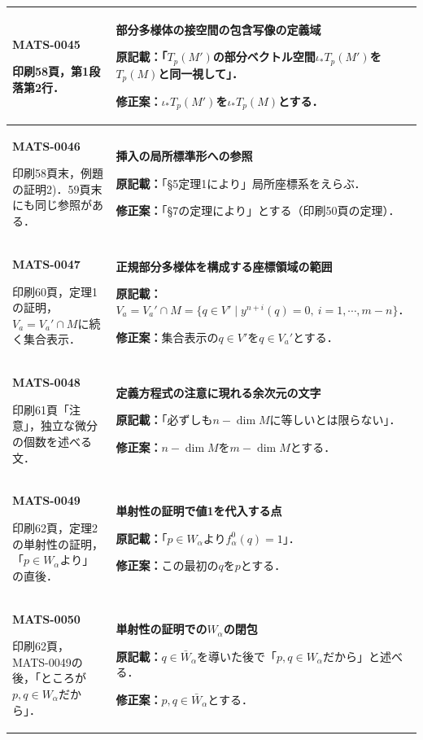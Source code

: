\documentclass[a4paper,10pt]{ltjsarticle}
\begin{document}
\begin{longtable}{@{}>{\raggedright\arraybackslash}p{.19\linewidth}>{\raggedright\arraybackslash}p{.77\linewidth}@{}}
\hline
\hypertarget{MATS-0045}{}\textbf{MATS-0045}\par 印刷58頁，第1段落第2行． & \textbf{部分多様体の接空間の包含写像の定義域}\par\textbf{原記載：}「$T_p(M')$の部分ベクトル空間$\iota_*T_p(M')$を$T_p(M)$と同一視して」．\par\textbf{修正案：}$\iota_*T_p(M')$を$\iota_*T_p(M)$とする． \\[3pt]
\hline
\hypertarget{MATS-0046}{}\textbf{MATS-0046}\par 印刷58頁末，例題の証明2)．59頁末にも同じ参照がある． & \textbf{挿入の局所標準形への参照}\par\textbf{原記載：}「\S5定理1により」局所座標系をえらぶ．\par\textbf{修正案：}「\S7の定理により」とする（印刷50頁の定理）． \\[3pt]
\hline
\hypertarget{MATS-0047}{}\textbf{MATS-0047}\par 印刷60頁，定理1の証明，$V_a=V_a'\cap M$に続く集合表示． & \textbf{正規部分多様体を構成する座標領域の範囲}\par\textbf{原記載：}$V_a=V_a'\cap M=\{q\in V'\mid y^{n+i}(q)=0,\ i=1,\cdots,m-n\}$．\par\textbf{修正案：}集合表示の$q\in V'$を$q\in V_a'$とする． \\[3pt]
\hline
\hypertarget{MATS-0048}{}\textbf{MATS-0048}\par 印刷61頁「注意」，独立な微分の個数を述べる文． & \textbf{定義方程式の注意に現れる余次元の文字}\par\textbf{原記載：}「必ずしも$n-\dim M$に等しいとは限らない」．\par\textbf{修正案：}$n-\dim M$を$m-\dim M$とする． \\[3pt]
\hline
\hypertarget{MATS-0049}{}\textbf{MATS-0049}\par 印刷62頁，定理2の単射性の証明，「$p\in W_\alpha$より」の直後． & \textbf{単射性の証明で値1を代入する点}\par\textbf{原記載：}「$p\in W_\alpha$より$f_\alpha^0(q)=1$」．\par\textbf{修正案：}この最初の$q$を$p$とする． \\[3pt]
\hline
\hypertarget{MATS-0050}{}\textbf{MATS-0050}\par 印刷62頁，MATS-0049の後，「ところが$p,q\in W_\alpha$だから」． & \textbf{単射性の証明での$W_\alpha$の閉包}\par\textbf{原記載：}$q\in\bar W_\alpha$を導いた後で「$p,q\in W_\alpha$だから」と述べる．\par\textbf{修正案：}$p,q\in\bar W_\alpha$とする． \\[3pt]

\end{longtable}
\end{document}
